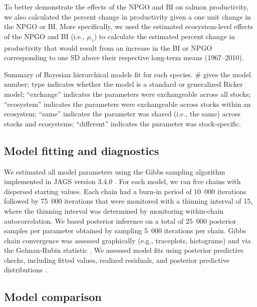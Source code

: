 To better demonstrate the effects of the NPGO and BI on salmon productivity, we
also calculated the percent change in productivity given a one unit change in
the NPGO or BI. More specifically, we used the estimated ecosystem-level effects
of the NPGO and BI (i.e., \(\mu_{\gamma}\)) to calculate the estimated percent
change in productivity that would result from an increase in the BI or NPGO
corresponding to one SD above their respective long-term means (1967--2010).

\begin{table}[htbp]
  \small \centering \libertineLF
  \caption[Summary of Bayesian hierarchical models fit for each
           species]{Summary of Bayesian hierarchical models fit for each
           species. \# gives the model number; type indicates whether the
           model is a standard or generalized Ricker model; ``exchange''
           indicates the parameters were exchangeable across all stocks;
           ``ecosystem'' indicates the parameters were exchangeable across
           stocks within an ecosystem; ``same'' indicates the parameter was
           shared (i.e., the same) across stocks and ecosystems; ``different''
           indicates the parameter was stock-specific.}
  
  \label{tab:npc:1}
\end{table}


\subsection{Model fitting and diagnostics}

We estimated all model parameters using the Gibbs sampling algorithm implemented
in JAGS version 3.4.0 \citep{Plummer2003}. For each model, we ran five chains
with dispersed starting values. Each chain had a burn-in period of 10~000
iterations followed by 75~000 iterations that were monitored with a thinning
interval of 15, where the thinning interval was determined by monitoring
within-chain autocorrelation. We based posterior inference on a total of 25~000
posterior samples per parameter obtained by sampling 5~000 iterations per chain.
Gibbs chain convergence was assessed graphically (e.g., traceplots, histograms)
and via the Gelman-Rubin statistic \citep{Gelman1992, Brooks1998}. We assessed
model fits using posterior predictive checks, including fitted values, realized
residuals, and posterior predictive distributions \citep{Gelman2004a}.


\subsection{Model comparison}

